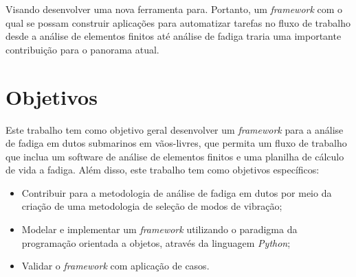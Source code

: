 Visando desenvolver uma nova ferramenta para. Portanto, um \textit{framework} com o qual se possam construir aplicações para automatizar tarefas no fluxo de trabalho desde a análise de elementos finitos até análise de fadiga traria uma importante contribuição para o panorama atual.


\section{Objetivos}


Este trabalho tem como objetivo geral desenvolver um \textit{framework} para a análise de fadiga em dutos submarinos em vãos-livres, que permita um fluxo de trabalho que inclua um software de análise de elementos finitos e uma planilha de cálculo de vida a fadiga.
Além disso, este trabalho tem como objetivos específicos:

\begin{itemize}
    \item Contribuir para a metodologia de análise de fadiga em dutos por meio da criação de uma metodologia de seleção de modos de vibração;
    \item Modelar e implementar um \textit{framework} utilizando o paradigma da programação orientada a objetos, através da linguagem \textit{Python};
    \item Validar o \textit{framework} com aplicação de casos.
\end{itemize}







